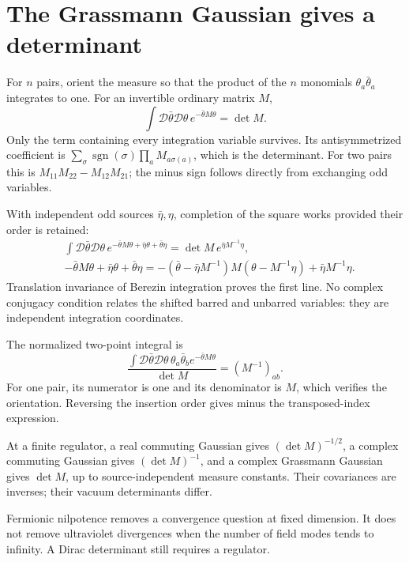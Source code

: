 \documentclass[11pt]{article}
\newcommand{\D}{\mathcal D}
\newcommand{\module}[1]{\clearpage\section{#1}}
\begin{document}
\module{The Grassmann Gaussian gives a determinant}
For \(n\) pairs, orient the measure so that the product of the
\(n\) monomials \(\theta_a\bar\theta_a\) integrates to one.
For an invertible ordinary matrix \(M\),
\begin{equation}
 \int\D\bar\theta\D\theta\,e^{-\bar\theta M\theta}=\det M.
                                                        \label{eq:det}
\end{equation}
Only the term containing every integration variable survives.
Its antisymmetrized coefficient is
\(\sum_\sigma\operatorname{sgn}(\sigma)\prod_a M_{a\sigma(a)}\),
which is the determinant. For two pairs this is
\(M_{11}M_{22}-M_{12}M_{21}\); the minus sign follows directly
from exchanging odd variables.

With independent odd sources \(\bar\eta,\eta\), completion of the square
works provided their order is retained:
\begin{align}
 &\int\D\bar\theta\D\theta\,
 e^{-\bar\theta M\theta+\bar\eta\theta+\bar\theta\eta}
   =\det M\,e^{\bar\eta M^{-1}\eta},                 \label{eq:euclgauss}\\
 &-\bar\theta M\theta+\bar\eta\theta+\bar\theta\eta
 =-(\bar\theta-\bar\eta M^{-1})M(\theta-M^{-1}\eta)
   +\bar\eta M^{-1}\eta.
\end{align}
Translation invariance of Berezin integration proves the first line.
No complex conjugacy condition relates the shifted barred and unbarred
variables: they are independent integration coordinates.

The normalized two-point integral is
\begin{equation}
 \frac{\int\D\bar\theta\D\theta\,
             \theta_a\bar\theta_b e^{-\bar\theta M\theta}}
      {\det M}=(M^{-1})_{ab}.
                                                        \label{eq:finitecov}
\end{equation}
For one pair, its numerator is one and its denominator is \(M\),
which verifies the orientation. Reversing the insertion order gives
minus the transposed-index expression.

\begin{keyidea}
At a finite regulator, a real commuting Gaussian gives
\((\det M)^{-1/2}\), a complex commuting Gaussian gives
\((\det M)^{-1}\), and a complex Grassmann Gaussian gives
\(\det M\), up to source-independent measure constants.
Their covariances are inverses; their vacuum determinants differ.
\end{keyidea}
Fermionic nilpotence removes a convergence question at fixed dimension.
It does not remove ultraviolet divergences when the number of field
modes tends to infinity. A Dirac determinant still requires a regulator.
\end{document}
